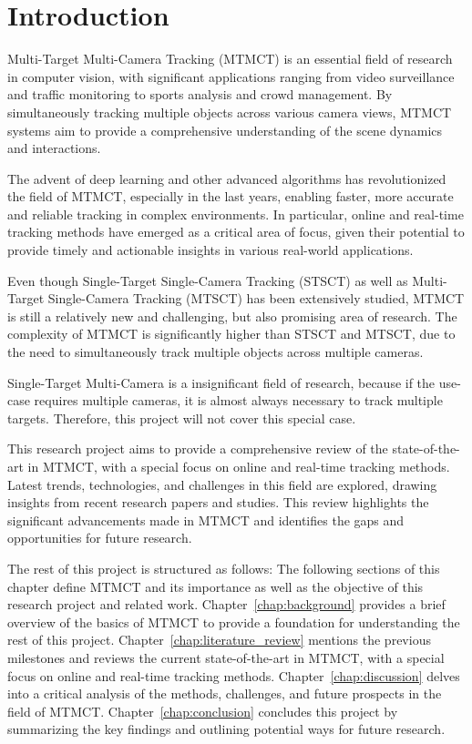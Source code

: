 \chapter{Introduction}\label{chap:introduction}
Multi-Target Multi-Camera Tracking (MTMCT) is an essential field of research in computer vision, with significant applications ranging from video surveillance and traffic monitoring to sports analysis and crowd management. By simultaneously tracking multiple objects across various camera views, MTMCT systems aim to provide a comprehensive understanding of the scene dynamics and interactions.

The advent of deep learning and other advanced algorithms has revolutionized the field of MTMCT, especially in the last years, enabling faster, more accurate and reliable tracking in complex environments. In particular, online and real-time tracking methods have emerged as a critical area of focus, given their potential to provide timely and actionable insights in various real-world applications.

Even though Single-Target Single-Camera Tracking (STSCT) as well as Multi-Target Single-Camera Tracking (MTSCT) has been extensively studied, MTMCT is still a relatively new and challenging, but also promising area of research. The complexity of MTMCT is significantly higher than STSCT and MTSCT, due to the need to simultaneously track multiple objects across multiple cameras.

Single-Target Multi-Camera is a insignificant field of research, because if the use-case requires multiple cameras, it is almost always necessary to track multiple targets. Therefore, this project will not cover this special case.

This research project aims to provide a comprehensive review of the state-of-the-art in MTMCT, with a special focus on online and real-time tracking methods. Latest trends, technologies, and challenges in this field are explored, drawing insights from recent research papers and studies. This review highlights the significant advancements made in MTMCT and identifies the gaps and opportunities for future research.

The rest of this project is structured as follows: The following sections of this chapter define MTMCT and its importance as well as the objective of this research project and related work. Chapter~\ref{chap:background} provides a brief overview of the basics of MTMCT to provide a foundation for understanding the rest of this project. Chapter~\ref{chap:literature_review} mentions the previous milestones and reviews the current state-of-the-art in MTMCT, with a special focus on online and real-time tracking methods. Chapter~\ref{chap:discussion} delves into a critical analysis of the methods, challenges, and future prospects in the field of MTMCT. Chapter~\ref{chap:conclusion} concludes this project by summarizing the key findings and outlining potential ways for future research.

